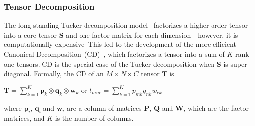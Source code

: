 \subsubsection{Tensor Decomposition}
The long-standing Tucker decomposition model~\cite{tucker1963implications} factorizes a 
higher-order tensor into a core tensor $\mathbf{S}$ and one factor matrix for each 
dimension---however, it is computationally expensive.
This led to the development of the more efficient Canonical Decomposition~(CD)~\cite{carroll1970analysis}, which factorizes a tensor into a sum of $K$ rank-one tensors.
CD is the special case of the Tucker decomposition when $\mathbf{S}$ is super-diagonal.
Formally, the CD of an $M \times N \times C$ tensor $\mathbf{T}$ is
\begin{center}
$\mathbf{T}=\sum\limits_{k=1}^{K}\mathbf{p}_k\otimes \mathbf{q}_k\otimes \mathbf{w}_k$
or
$t_{mnc}=\sum\limits_{k=1}^{K}p_{mk} q_{nk} w_{ck}$
\end{center}
where $\mathbf{p}_i$, $\mathbf{q}_i$ and $\mathbf{w}_i$ are a column of matrices $\mathbf{P}$, $\mathbf{Q}$ and $\mathbf{W}$, which are the factor matrices, and $K$ is the number of columns. 



